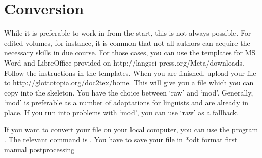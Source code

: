 \chapter{Conversion}
While it is preferable to work in \latex from the start, this is not always possible. For edited volumes, for instance, it is common that not all authors can acquire the necessary skills in due course. For those cases, you can use the templates for MS Word and LibreOffice provided on http://langsci-press.org/Meta/downloads. Follow the instructions in the templates. When you are finished, upload your file to \url{http://glottotopia.org/doc2tex/home}. This will give you a file which you can copy into the skeleton. You have the choice between `raw' and `mod'. Generally, `mod' is preferable as a number of adaptations for linguists and \lsp are already in place. If you run into problems with `mod', you can use `raw' as a fallback.


If you want to convert your file on your local computer, you can use the program . The relevant command is . You have to save your file in *odt format first
manual postprocessing
